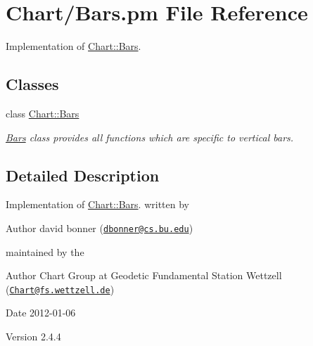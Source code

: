 \hypertarget{Bars_8pm}{
\section{Chart/Bars.pm File Reference}
\label{Bars_8pm}
}


Implementation of \hyperlink{classChart_1_1Bars}{Chart::Bars}.  


\subsection*{Classes}
\begin{DoxyCompactItemize}
\item 
class \hyperlink{classChart_1_1Bars}{Chart::Bars}
\begin{DoxyCompactList}\small\item\em \hyperlink{classChart_1_1Bars}{Bars} class provides all functions which are specific to vertical bars. \item\end{DoxyCompactList}\end{DoxyCompactItemize}


\subsection{Detailed Description}
Implementation of \hyperlink{classChart_1_1Bars}{Chart::Bars}. written by \begin{DoxyAuthor}{Author}
david bonner (\href{mailto:dbonner@cs.bu.edu}{\tt dbonner@cs.bu.edu})
\end{DoxyAuthor}
maintained by the \begin{DoxyAuthor}{Author}
Chart Group at Geodetic Fundamental Station Wettzell (\href{mailto:Chart@fs.wettzell.de}{\tt Chart@fs.wettzell.de}) 
\end{DoxyAuthor}
\begin{DoxyDate}{Date}
2012-\/01-\/06 
\end{DoxyDate}
\begin{DoxyVersion}{Version}
2.4.4 
\end{DoxyVersion}
